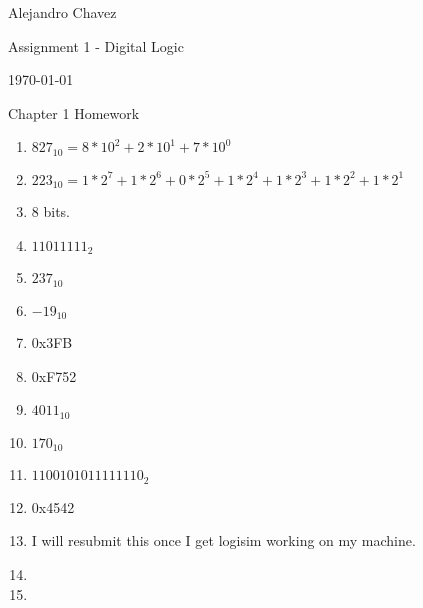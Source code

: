 \documentclass{article}
\begin{document}
\hfill Alejandro Chavez

\hfill Assignment 1 - Digital Logic

\hfill \today \\
\begin{center}
\large Chapter 1 Homework
\end{center}
\begin{enumerate}
  \item 
  $827_{10} = 8*10^{2} + 2*10^{1} + 7*10^{0}$ 
  \item
  $223_{10} = 
    1*2^{7} 
  + 1*2^{6} 
  + 0*2^{5} 
  + 1*2^{4} 
  + 1*2^{3} 
  + 1*2^{2} 
  + 1*2^{1}$
  \item
  8 bits.
  \item 
  $11011111_{2}$
  \item 
  $237_{10}$
  \item 
  $-19_{10}$
  \item 
  0x3FB
  \item
  0xF752
  \item
  $4011_{10}$
  \item
  $170_{10}$
  \item
  $1100 1010 1111 1110_{2}$
  \item
  0x4542
  \item
  I will resubmit this once I get logisim working on my machine.
  \item 
  \item 
\end{enumerate}
\end{document}
